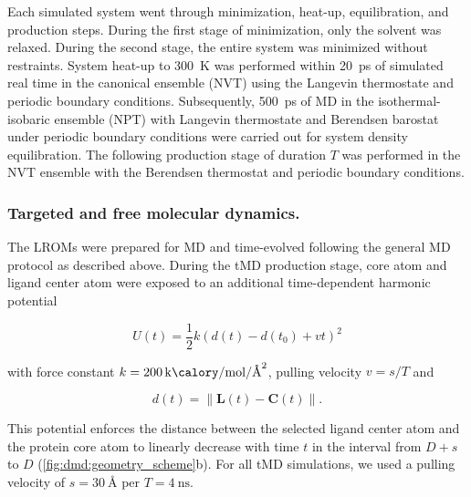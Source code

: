 Each simulated system went through minimization, heat-up, equilibration, and
production steps. During the first stage of minimization, only the solvent was
relaxed. During the second stage, the entire system was minimized without
restraints. System heat-up to \SI{300}{\kelvin} was performed within
\SI{20}{\pico\second} of simulated real time in the canonical ensemble (NVT)
using the Langevin thermostate and periodic boundary conditions. Subsequently,
\SI{500}{\pico\second} of MD in the isothermal-isobaric ensemble (NPT) with
Langevin thermostate and Berendsen barostat under periodic boundary conditions
were carried out for system density equilibration. The following production
stage of duration $T$ was performed in the NVT ensemble with the Berendsen
thermostat and periodic boundary conditions.


\subsubsection{Targeted and free molecular dynamics.}
The LROMs were prepared for MD and time-evolved following the general MD
protocol as described above. During the tMD production stage, core atom and
ligand center atom were exposed to an additional time-dependent harmonic
potential

\begin{equation}
U(t) = \frac{1}{2} k \left( d(t)-d(t_0) + vt   \right)^2
\end{equation}

with force constant $k=\SI{200}{\kilo\calory\per\mole\per\square\angstrom}$,
pulling velocity $v = s/T$ and

\begin{equation}
d(t) = \lVert \bm{L}(t)-\bm{C}(t) \rVert.
\end{equation}

This potential enforces the distance between the selected ligand center atom and
the protein core atom to linearly decrease with time $t$ in the interval from
$D+s$ to $D$ (\cref{fig:dmd:geometry_scheme}b). For all tMD simulations, we used
a pulling velocity of $s=\SI{30}{\angstrom}$ per $T=\SI{4}{\nano\second}$.

